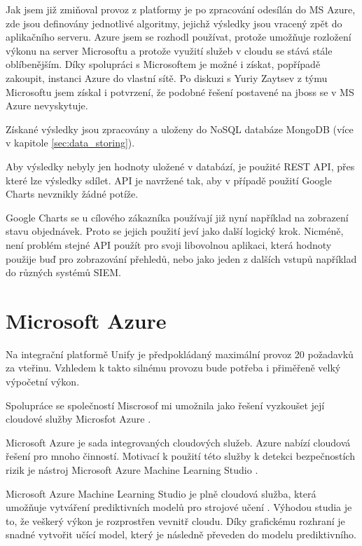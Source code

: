\documentclass[thesis=M,czech]{FITthesis}[2012/10/20]
\begin{document}
	Jak jsem již zmiňoval provoz z platformy je po zpracování odesílán do MS Azure, zde jsou definovány jednotlivé algoritmy, jejichž výsledky jsou vracený zpět do aplikačního serveru. Azure jsem se rozhodl používat, protože umožňuje rozložení výkonu na server Microsoftu a protože využití služeb v cloudu se stává stále oblíbenějším. Díky spolupráci s Microsoftem je možné i získat, popřípadě zakoupit, instanci Azure do vlastní sítě. Po diskuzi s Yuriy Zaytsev z týmu Microsoftu jsem získal i potvrzení, že podobné řešení postavené na jboss se v MS Azure nevyskytuje.
	
	Získané výsledky jsou zpracovány a uloženy do NoSQL databáze MongoDB (více v kapitole \ref{sec:data_storing}).
	
	Aby výsledky nebyly jen hodnoty uložené v databází, je použité REST API, přes které lze výsledky sdílet. API je navržené tak, aby v případě použití Google Charts nevznikly žádné potíže. 
	
	Google Charts se u cílového zákazníka používají již nyní například na zobrazení stavu objednávek. Proto se jejich použití jeví jako další logický krok. Nicméně, není problém stejné API použít pro svoji libovolnou aplikaci, která hodnoty použije buď pro zobrazování přehledů, nebo jako jeden z dalších vstupů například do různých systémů SIEM.
	
	\section{Microsoft Azure}
		\label{sec:ms_azure}
		Na integrační platformě Unify \cite{unify} je předpokládaný maximální provoz 20 požadavků za vteřinu. Vzhledem k takto silnému provozu bude potřeba i přiměřeně velký výpočetní výkon. 
			
		Spolupráce se společností Miscrosof \cite{microsoft} mi umožnila jako řešení vyzkoušet její cloudové služby Microsfot Azure \cite{msAzure}.
			
		Microsoft Azure je sada integrovaných cloudových služeb. Azure nabízí cloudová řešení pro mnoho činností. Motivací k použití této služby k detekci bezpečnostích rizik je nástroj Microsoft Azure Machine Learning Studio \cite{msAzureStudio}.
			
		Microsoft Azure Machine Learning Studio je plně cloudová služba, která umožňuje vytváření prediktivních modelů pro strojové učení \cite{msAzureStudio}. Výhodou studia je to, že veškerý výkon je rozprostřen vevnitř cloudu. Díky grafickému rozhraní je snadné vytvořit učící model, který je následně převeden do modelu prediktivního.
			
\end{document}
